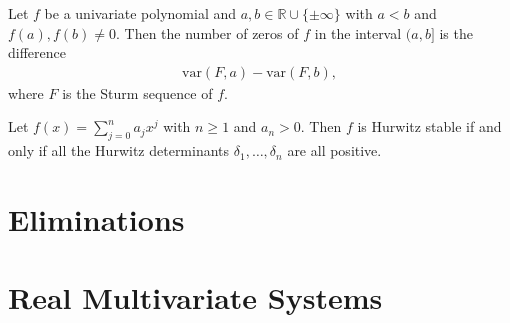 \documentclass[12pt]{amsart}
\theoremstyle{definition}
\begin{document}


Let $f$ be a univariate polynomial and $a,b\in \mathbb{R}\cup\{\pm\infty\}$ with $a<b$ and $f(a),f(b)\neq 0$. Then the number of zeros of $f$ in the interval $(a,b]$ is the difference 
\begin{align*}
\text{var}(F,a) - \text{var}(F,b),
\end{align*}
where $F$ is the Sturm sequence of $f$.



\theorem
Let $f(x) = \sum_{j=0}^{n}a_{j}x^{j}$ with $n\geq 1$ and $a_{n}>0$. Then $f$ is Hurwitz stable if and only if all the Hurwitz determinants $\delta_{1},\dots,\delta_{n}$ are all positive.
%
%

\section{Eliminations}
%


\section{Real Multivariate Systems}
%



%

\end{document}
